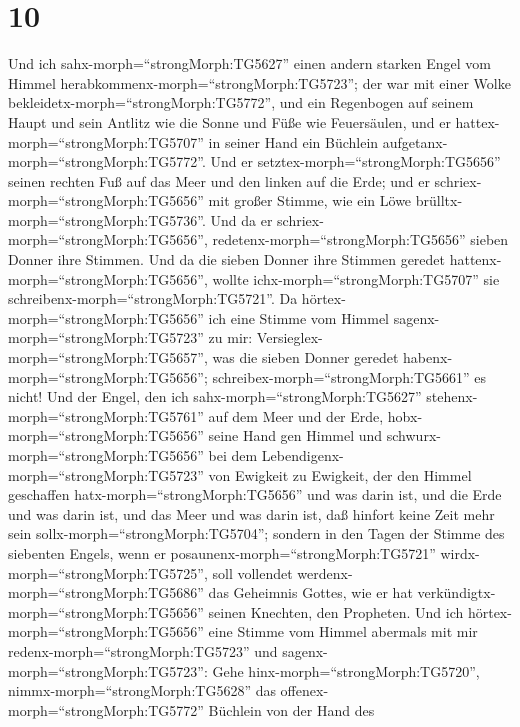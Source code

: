 \hypertarget{section-9}{%
\section{10}\label{section-9}}

 Und ich sahx-morph=``strongMorph:TG5627'' einen andern
starken Engel vom Himmel herabkommenx-morph=``strongMorph:TG5723''; der
war mit einer Wolke bekleidetx-morph=``strongMorph:TG5772'', und ein
Regenbogen auf seinem Haupt und sein Antlitz wie die Sonne und Füße wie
Feuersäulen,  und er hattex-morph=``strongMorph:TG5707'' in
seiner Hand ein Büchlein aufgetanx-morph=``strongMorph:TG5772''. Und er
setztex-morph=``strongMorph:TG5656'' seinen rechten Fuß auf das Meer und
den linken auf die Erde;  und er
schriex-morph=``strongMorph:TG5656'' mit großer Stimme, wie ein Löwe
brülltx-morph=``strongMorph:TG5736''. Und da er
schriex-morph=``strongMorph:TG5656'',
redetenx-morph=``strongMorph:TG5656'' sieben Donner ihre Stimmen.
 Und da die sieben Donner ihre Stimmen geredet
hattenx-morph=``strongMorph:TG5656'', wollte
ichx-morph=``strongMorph:TG5707'' sie
schreibenx-morph=``strongMorph:TG5721''. Da
hörtex-morph=``strongMorph:TG5656'' ich eine Stimme vom Himmel
sagenx-morph=``strongMorph:TG5723'' zu mir:
Versieglex-morph=``strongMorph:TG5657'', was die sieben Donner geredet
habenx-morph=``strongMorph:TG5656'';
schreibex-morph=``strongMorph:TG5661'' es nicht!  Und der
Engel, den ich sahx-morph=``strongMorph:TG5627''
stehenx-morph=``strongMorph:TG5761'' auf dem Meer und der Erde,
hobx-morph=``strongMorph:TG5656'' seine Hand gen Himmel  und
schwurx-morph=``strongMorph:TG5656'' bei dem
Lebendigenx-morph=``strongMorph:TG5723'' von Ewigkeit zu Ewigkeit, der
den Himmel geschaffen hatx-morph=``strongMorph:TG5656'' und was darin
ist, und die Erde und was darin ist, und das Meer und was darin ist, daß
hinfort keine Zeit mehr sein sollx-morph=``strongMorph:TG5704'';
 sondern in den Tagen der Stimme des siebenten Engels, wenn
er posaunenx-morph=``strongMorph:TG5721''
wirdx-morph=``strongMorph:TG5725'', soll vollendet
werdenx-morph=``strongMorph:TG5686'' das Geheimnis Gottes, wie er hat
verkündigtx-morph=``strongMorph:TG5656'' seinen Knechten, den Propheten.
 Und ich hörtex-morph=``strongMorph:TG5656'' eine Stimme vom
Himmel abermals mit mir redenx-morph=``strongMorph:TG5723'' und
sagenx-morph=``strongMorph:TG5723'': Gehe
hinx-morph=``strongMorph:TG5720'', nimmx-morph=``strongMorph:TG5628''
das offenex-morph=``strongMorph:TG5772'' Büchlein von der Hand des
